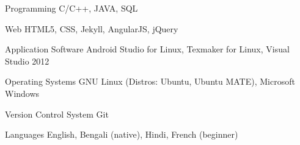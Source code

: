 


\begin{cvskills}


\cvskill
{Programming} %
{C/C++, JAVA, SQL} %


\cvskill
{Web} %
{ HTML5, CSS, Jekyll, AngularJS, jQuery} %


\cvskill
{Application Software} %
{Android Studio for Linux, Texmaker for Linux, Visual Studio 2012} %


\cvskill
{Operating Systems} %
{GNU Linux (Distros: Ubuntu, Ubuntu MATE), Microsoft Windows} %


\cvskill
{Version Control System} %
{Git} %


\cvskill
{Languages} %
{English, Bengali (native), Hindi, French (beginner)} %


\end{cvskills}